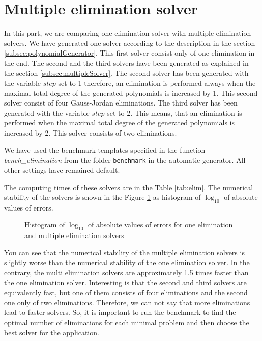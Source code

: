 \section{Multiple elimination solver}
\label{exp:elim}
In this part, we are comparing one elimination solver with multiple elimination solvers. We have generated one solver according to the description in the section \ref{subsec:polynomialGenerator}. This first solver consist only of one elimination in the end. The second and the third solvers have been generated as explained in the section \ref{subsec:multipleSolver}. The second solver has been generated with the variable $step$ set to 1 therefore, an elimination is performed always when the maximal total degree of the generated polynomials is increased by 1. This second solver consist of four Gauss-Jordan eliminations. The third solver has been generated with the variable $step$ set to 2. This means, that an elimination is performed when the maximal total degree of the generated polynomials is increased by 2. This solver consists of two eliminations.

We have used the benchmark templates specified in the function \textit{bench\_elimination} from the folder \texttt{benchmark} in the automatic generator. All other settings have remained default.

The computing times of these solvers are in the Table \ref{tab:elim}. The numerical stability of the solvers is shown in the Figure \ref{graph:elim} as histogram of $\log_{10}$ of absolute values of errors.

\begin{figure}[ht]
  \centering
  \resizebox{0.95\textwidth}{!}{}
  \caption{Histogram of $\log_{10}$ of absolute values of errors for one elimination and multiple elimination solvers}
  \label{graph:elim}
\end{figure}

You can see that the numerical stability of the multiple elimination solvers is slightly worse than the numerical stability of the one elimination solver. In the contrary, the multi elimination solvers are approximately 1.5 times faster than the one elimination solver. Interesting is that the second and third solvers are equivalently fast, but one of them consists of four eliminations and the second one only of two eliminations. Therefore, we can not say that more eliminations lead to faster solvers. So, it is important to run the benchmark to find the optimal number of eliminations for each minimal problem and then choose the best solver for the application.

